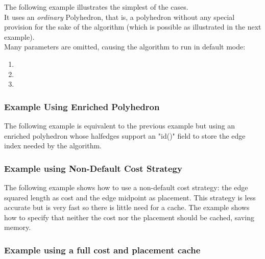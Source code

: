 The following example illustrates the simplest of the cases.\\
It uses an {\em ordinary} Polyhedron, that is, a polyhedron without any special provision 
for the sake of the algorithm (which is possible as illustrated in the next example).\\
Many parameters are omitted, causing the algorithm to run in default mode:

\begin{enumerate}
\item {}
\item {}
\item {}
\end{enumerate}


\subsubsection{Example Using Enriched Polyhedron}

The following example is equivalent to the previous example but using an
enriched polyhedron whose halfedges support an "id()" field to
store the edge index needed by the algorithm.


\subsubsection{Example using Non-Default Cost Strategy}

The following example shows how to use a non-default cost strategy: the edge squared length
as cost and the edge midpoint as placement. This strategy is less accurate but
is very fast so there is little need for a cache. The example shows how to specify 
that neither the cost nor the placement should be cached, saving memory.


\subsubsection{Example using a full cost and placement cache}

